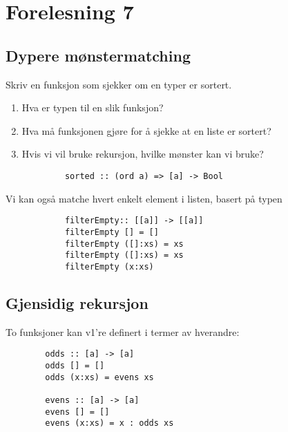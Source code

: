 \documentclass{article}
\begin{document}
    \section{Forelesning 7}

    \subsection{Dypere mønstermatching}

    \begin{eg}
        Skriv en funksjon som sjekker om en typer er sortert.

        \begin{enumerate}
            \item Hva er typen til en slik funksjon?
            \item Hva må funksjonen gjøre for å sjekke at en liste er sortert?
            \item Hvis vi vil bruke rekursjon, hvilke mønster kan vi bruke?
        \end{enumerate}

        \begin{lstlisting}
            sorted :: (ord a) => [a] -> Bool
        \end{lstlisting}
    \end{eg}

    \begin{eg}
        Vi kan også matche hvert enkelt element i listen, basert på typen

        \begin{lstlisting}
            filterEmpty:: [[a]] -> [[a]]
            filterEmpty [] = []
            filterEmpty ([]:xs) = xs
            filterEmpty ([]:xs) = xs
            filterEmpty (x:xs)
        \end{lstlisting}
    \end{eg}

    \subsection{Gjensidig rekursjon}
    To funksjoner kan v1're definert i termer av hverandre:

    \begin{lstlisting}
        odds :: [a] -> [a]
        odds [] = []
        odds (x:xs) = evens xs

        evens :: [a] -> [a]
        evens [] = []
        evens (x:xs) = x : odds xs
    \end{lstlisting}
\end{document}
